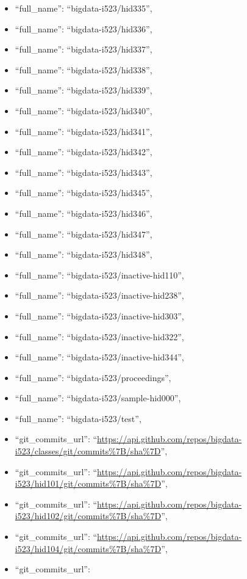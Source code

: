 \begin{itemize}
\item
  ``full\_name'': ``bigdata-i523/hid335'',
\item
  ``full\_name'': ``bigdata-i523/hid336'',
\item
  ``full\_name'': ``bigdata-i523/hid337'',
\item
  ``full\_name'': ``bigdata-i523/hid338'',
\item
  ``full\_name'': ``bigdata-i523/hid339'',
\item
  ``full\_name'': ``bigdata-i523/hid340'',
\item
  ``full\_name'': ``bigdata-i523/hid341'',
\item
  ``full\_name'': ``bigdata-i523/hid342'',
\item
  ``full\_name'': ``bigdata-i523/hid343'',
\item
  ``full\_name'': ``bigdata-i523/hid345'',
\item
  ``full\_name'': ``bigdata-i523/hid346'',
\item
  ``full\_name'': ``bigdata-i523/hid347'',
\item
  ``full\_name'': ``bigdata-i523/hid348'',
\item
  ``full\_name'': ``bigdata-i523/inactive-hid110'',
\item
  ``full\_name'': ``bigdata-i523/inactive-hid238'',
\item
  ``full\_name'': ``bigdata-i523/inactive-hid303'',
\item
  ``full\_name'': ``bigdata-i523/inactive-hid322'',
\item
  ``full\_name'': ``bigdata-i523/inactive-hid344'',
\item
  ``full\_name'': ``bigdata-i523/proceedings'',
\item
  ``full\_name'': ``bigdata-i523/sample-hid000'',
\item
  ``full\_name'': ``bigdata-i523/test'',
\item
  ``git\_commits\_url'':
  ``\url{https://api.github.com/repos/bigdata-i523/classes/git/commits\%7B/sha\%7D}'',
\item
  ``git\_commits\_url'':
  ``\url{https://api.github.com/repos/bigdata-i523/hid101/git/commits\%7B/sha\%7D}'',
\item
  ``git\_commits\_url'':
  ``\url{https://api.github.com/repos/bigdata-i523/hid102/git/commits\%7B/sha\%7D}'',
\item
  ``git\_commits\_url'':
  ``\url{https://api.github.com/repos/bigdata-i523/hid104/git/commits\%7B/sha\%7D}'',
\item
  ``git\_commits\_url'':

\end{itemize}
